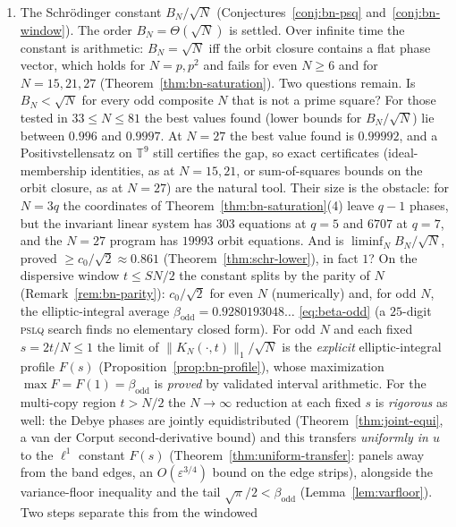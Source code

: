 \documentclass[11pt,reqno]{amsart}
\theoremstyle{plain}
\theoremstyle{definition}
\begin{document}
\begin{enumerate}
\emph{not} transfer (\texttt{verify\_excess\_omega2\_spectral.py}). Structurally this is the \emph{same}
obstruction as the multi-copy residual~(2) (\texttt{verify\_excess\_omega2.py}).
\item The Schr\"odinger constant $B_N/\sqrt N$ (Conjectures~\ref{conj:bn-psq} and~\ref{conj:bn-window}). The
order $B_N=\Theta(\sqrt N)$ is settled. Over infinite time
the constant is arithmetic: $B_N=\sqrt N$ iff the orbit closure contains a flat phase vector, which holds for
$N=p,p^2$ and fails for even $N\ge6$ and for $N=15,21,27$ (Theorem~\ref{thm:bn-saturation}). Two questions remain. Is
$B_N<\sqrt N$ for every odd composite $N$ that is not a prime square? For those tested in $33\le N\le81$ the best values found (lower bounds for $B_N/\sqrt N$) lie between $0.996$ and $0.9997$.
At $N=27$ the best value found is $0.99992$, and a Positivstellensatz on $\mathbb T^9$ still certifies the gap, so
exact certificates (ideal-membership identities, as at $N=15,21$, or sum-of-squares bounds on the orbit closure, as
at $N=27$) are the natural tool. Their size is the obstacle: for $N=3q$ the coordinates of
Theorem~\ref{thm:bn-saturation}(4) leave $q-1$ phases, but the invariant linear system has $303$ equations at $q=5$
and $6707$ at $q=7$, and the $N=27$ program has $19993$ orbit equations. And is $\liminf_NB_N/\sqrt N$, proved $\ge c_0/\sqrt2\approx0.861$ (Theorem~\ref{thm:schr-lower}), in fact
$1$? On the dispersive window $t\le SN/2$ the constant splits by the parity of $N$ (Remark~\ref{rem:bn-parity}):
$c_0/\sqrt2$ for even $N$ (numerically) and, for odd $N$, the elliptic-integral average
$\beta_{\mathrm{odd}}=0.9280193048\ldots$ \eqref{eq:beta-odd} (a $25$-digit \textsc{pslq} search finds no
elementary closed form). For odd $N$ and each fixed $s=2t/N\le1$ the limit of $\|K_N(\cdot,t)\|_1/\sqrt N$ is
the \emph{explicit} elliptic-integral profile $F(s)$ (Proposition~\ref{prop:bn-profile}), whose maximization
$\max F=F(1)=\beta_{\mathrm{odd}}$ is \emph{proved} by validated interval arithmetic. For the multi-copy region
$t>N/2$ the $N\to\infty$ reduction at each fixed $s$ is \emph{rigorous} as well: the Debye phases are jointly
equidistributed (Theorem~\ref{thm:joint-equi}, a van der Corput second-derivative bound) and this transfers
\emph{uniformly in $u$} to the $\ell^1$ constant $F(s)$ (Theorem~\ref{thm:uniform-transfer}: panels away from the
band edges, an $O(\varepsilon^{3/4})$ bound on the edge strips), alongside the variance-floor inequality and the
tail $\sqrt\pi/2<\beta_{\mathrm{odd}}$ (Lemma~\ref{lem:varfloor}). Two steps separate this from the windowed

\end{enumerate}
\end{document}
